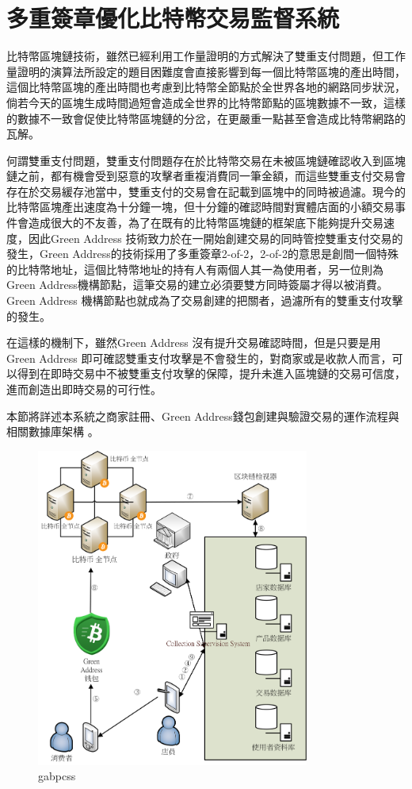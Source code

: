 
\chapter{多重簽章優化比特幣交易監督系統}
比特幣區塊鏈技術，雖然已經利用工作量證明的方式解決了雙重支付問題，但工作量證明的演算法所設定的題目困難度會直接影響到每一個比特幣區塊的產出時間，這個比特幣區塊的產出時間也考慮到比特幣全節點於全世界各地的網路同步狀況，倘若今天的區塊生成時間過短會造成全世界的比特幣節點的區塊數據不一致，這樣的數據不一致會促使比特幣區塊鏈的分岔，在更嚴重一點甚至會造成比特幣網路的瓦解。 

何謂雙重支付問題，雙重支付問題存在於比特幣交易在未被區塊鏈確認收入到區塊鏈之前，都有機會受到惡意的攻擊者重複消費同一筆金額，而這些雙重支付交易會存在於交易緩存池當中，雙重支付的交易會在記載到區塊中的同時被過濾。現今的比特幣區塊產出速度為十分鐘一塊，但十分鐘的確認時間對實體店面的小額交易事件會造成很大的不友善，為了在既有的比特幣區塊鏈的框架底下能夠提升交易速度，因此Green Address 技術致力於在一開始創建交易的同時管控雙重支付交易的發生，Green Address的技術採用了多重簽章2-of-2，2-of-2的意思是創間一個特殊的比特幣地址，這個比特幣地址的持有人有兩個人其一為使用者，另一位則為Green Address機構節點，這筆交易的建立必須要雙方同時簽屬才得以被消費。Green Address 機構節點也就成為了交易創建的把關者，過濾所有的雙重支付攻擊的發生。 

在這樣的機制下，雖然Green Address 沒有提升交易確認時間，但是只要是用Green Address 即可確認雙重支付攻擊是不會發生的，對商家或是收款人而言，可以得到在即時交易中不被雙重支付攻擊的保障，提升未進入區塊鏈的交易可信度，進而創造出即時交易的可行性。 

本節將詳述本系統之商家註冊、Green Address錢包創建與驗證交易的運作流程與相關數據庫架構 。
	\begin{figure}[h]
		\centering
		\includegraphics[width = 0.8\textwidth]{gabpcss.png}
		\caption{gabpcss}\label{gabpcss}
	\end{figure}

